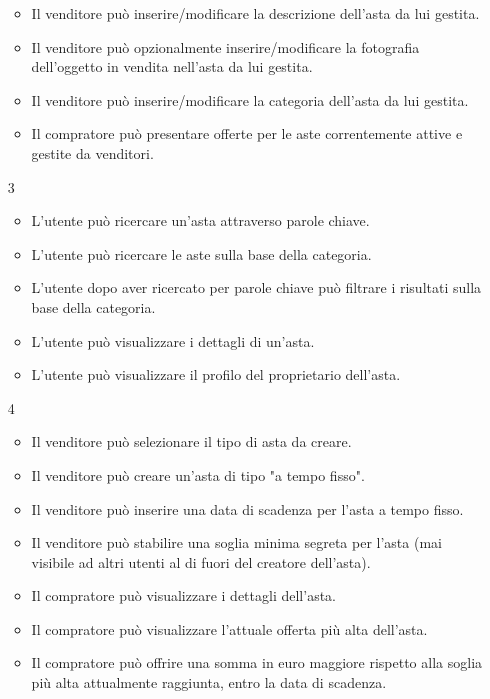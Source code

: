 \begin{itemize}
\begin{itemize}
                    \item Il venditore può inserire/modificare la descrizione dell'asta da lui gestita.
                    \item Il venditore può opzionalmente inserire/modificare la fotografia dell'oggetto in vendita nell'asta da lui gestita.
                    \item Il venditore può inserire/modificare la categoria dell'asta da lui gestita.
                    \item Il compratore può presentare offerte per le aste correntemente attive e gestite da venditori.
                \end{itemize}
            \item[3]
                \begin{itemize}
                    \item L'utente può ricercare un'asta attraverso parole chiave.
                    \item L'utente può ricercare le aste sulla base della categoria.
                    \item L’utente dopo aver ricercato per parole chiave può filtrare i risultati sulla base della categoria.
                    \item L'utente può visualizzare i dettagli di un'asta.
                    \item L'utente può visualizzare il profilo del proprietario dell'asta.
                \end{itemize}
            \item[4]
                \begin{itemize}
                    \item Il venditore può selezionare il tipo di asta da creare.
                    \item Il venditore può creare un'asta di tipo "a tempo fisso".
                    \item Il venditore può inserire una data di scadenza per l'asta a tempo fisso.
                    \item Il venditore può stabilire una soglia minima segreta per l'asta (mai visibile ad altri utenti al di fuori del creatore dell'asta).
                    \item Il compratore può visualizzare i dettagli dell'asta.
                    \item Il compratore può visualizzare l'attuale offerta più alta dell'asta.
                    \item Il compratore può offrire una somma in euro maggiore rispetto alla soglia più alta attualmente raggiunta, entro la data di scadenza.

\end{itemize}
\end{itemize}
